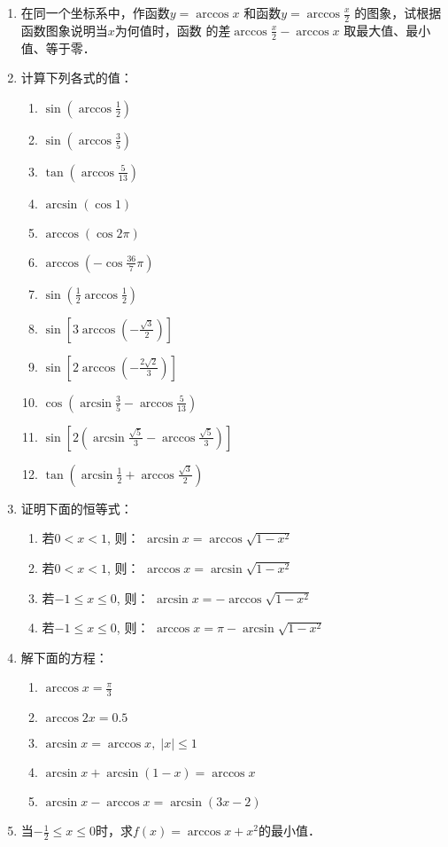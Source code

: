 \begin{enumerate}
\item 在同一个坐标系中，作函数$y=\arccos x$
和函数$y=\arccos\frac{x}{2}$
的图象，试根据函数图象说明当$x$为何值时，函数
的差$\arccos\frac{x}{2}-\arccos x$
取最大值、最小值、等于零．
\item 计算下列各式的值：
\begin{multicols}{2}
    \begin{enumerate}
\item $\sin \left(\arccos \frac{1}{2}\right)$
\item $\sin \left(\arccos \frac{3}{5}\right)$
\item $\tan \left(\arccos \frac{5}{13}\right)$
\item $\arcsin (\cos 1)$
\item $\arccos (\cos 2 \pi)$
\item $\arccos \left(-\cos \frac{36}{7} \pi\right)$
\item $\sin \left(\frac{1}{2} \arccos \frac{1}{2}\right)$
\item $\sin \left[3 \arccos \left(-\frac{\sqrt{3}}{2}\right)\right]$
\item $\sin \left[2 \arccos \left(-\frac{2 \sqrt{2}}{3}\right)\right]$
\item $\cos \left(\arcsin \frac{3}{5}-\arccos \frac{5}{13}\right)$    
\item $\sin\left[2\left(\arcsin\frac{\sqrt{5}}{3}-\arccos\frac{\sqrt{5}}{3}\right)\right]$
    \item $\tan\left(\arcsin\frac{1}{2}+\arccos\frac{\sqrt{3}}{2}\right)$
    \end{enumerate}
\end{multicols}

\item 证明下面的恒等式：
\begin{enumerate}
\item 若$0<x<1$, 则：
$\arcsin x=\arccos\sqrt{1-x^2}$
\item 若$0<x<1$, 则：
$\arccos x=\arcsin\sqrt{1-x^2}$
\item 若$-1\le x\le 0$, 则：
$\arcsin x=-\arccos\sqrt{1-x^2}$
\item 若$-1\le x\le 0$, 则：
$\arccos x=\pi-\arcsin\sqrt{1-x^2}$
\end{enumerate}

\item 解下面的方程：
    \begin{enumerate}
\item $\arccos x=\frac{\pi}{3}$
\item $\arccos 2x=0.5$
\item $\arcsin x=\arccos x,\; |x|\le 1$
\item $\arcsin x+\arcsin (1-x)=\arccos x$
\item $\arcsin x-\arccos x=\arcsin (3x-2)$
    \end{enumerate}

\item 当$-\frac{1}{2}\le x\le 0$时，求$f(x)
=\arccos x+x^2$的最小值．
\end{enumerate}


